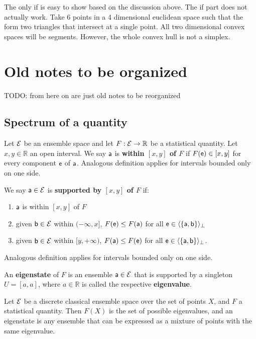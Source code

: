 \begin{remark}
	The only if is easy to show based on the discussion above. The if part does not actually work. Take 6 points in a 4 dimensional euclidean space such that the form two triangles that intersect at a single point. All two dimensional convex spaces will be segments. However, the whole convex hull is not a simplex. 
\end{remark}

\iffalse

\section{Old notes to be organized}
TODO: from here on are just old notes to be reorganized

\subsection{Spectrum of a quantity}

\begin{defn}
	Let $\Ens$ be an ensemble space and let $F : \Ens \to \mathbb{R}$ be a statistical quantity. Let $x,y \in \mathbb{R}$ an open interval. We say $\ens[a]$ is \textbf{within $[x,y]$ of $F$} if $F(\ens) \in [x,y]$ for every component $\ens$ of $\ens[a]$. Analogous definition applies for intervals bounded only on one side.
	
	We say $\ens[a] \in \Ens$ is \textbf{supported by $[x,y]$ of $F$} if:
	\begin{enumerate}
		\item $\ens[a]$ is within $[x,y]$ of $F$
		\item given $\ens[b] \in \Ens$ within $(-\infty,x]$, $F(\ens) \leq F(\ens[a])$ for all $\ens \in \langle \{\ens[a], \ens[b]\} \rangle_{\ortho}$
		\item given $\ens[b] \in \Ens$ within $[y, +\infty)$, $F(\ens[a]) \leq F(\ens)$ for all $\ens \in \langle \{\ens[a], \ens[b]\} \rangle_{\ortho}$.
	\end{enumerate}
	Analogous definition applies for intervals bounded only on one side.
	
	An \textbf{eigenstate} of $F$ is an ensemble $\ens[a] \in \Ens$ that is supported by a singleton $U=[a,a]$, where $a \in \mathbb{R}$ is called the respective \textbf{eigenvalue}. 
\end{defn}

\begin{prop}
	Let $\Ens$ be a discrete classical ensemble space over the set of points $X$, and $F$ a statistical quantity. Then $F(X)$ is the set of possible eigenvalues, and an eigenstate is any ensemble that can be expressed as a mixture of points with the same eigenvalue.
\end{prop}

